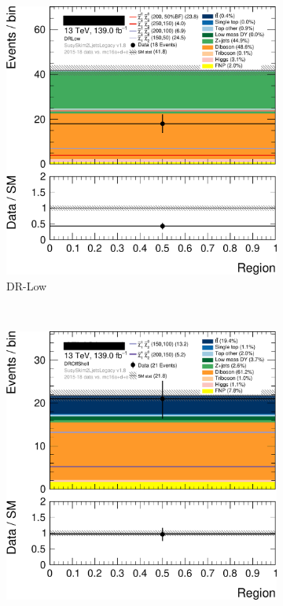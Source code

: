 \begin{figure}[tp]
\begin{subfigure}{0.495\textwidth}
\includegraphics[width=\textwidth]{figures/2ljets_disco_plot_DRLow.png}
\caption{DR-Low}
\end{subfigure}
\\[0.5em]
\begin{subfigure}{0.495\textwidth}
\centering
\includegraphics[width=\textwidth]{figures/2ljets_disco_plot_DROffShell.png}

\end{subfigure}
\end{figure}
